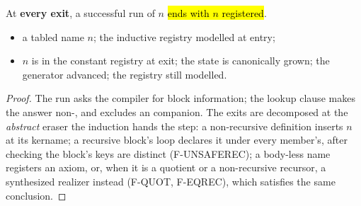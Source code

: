 \begin{lemma}
\label{lem:run_visitMutual_registers}
\leanok
{}
 At \textbf{every exit}, a successful run of  $n$ \hl{ends with $n$
registered}.
\begin{itemize}
\item {} a tabled name $n$; the inductive registry modelled at entry;
\item {} $n$ is in the constant registry at exit; the state is canonically grown; the generator
advanced; the registry still modelled.
\end{itemize}
\end{lemma}
\begin{proof}
\leanok
{}
 The run asks the compiler for block information; the lookup clause makes the answer
non-, and  excludes an  companion. The exits are
decomposed at the \emph{abstract} eraser the induction hands the step: a non-recursive definition
inserts $n$ at its kername; a recursive block's loop declares it under every member's, after checking
the block's keys are distinct (F-UNSAFEREC); a body-less name registers an axiom, or, when it is a
quotient or a non-recursive  recursor, a synthesized realizer instead (F-QUOT, F-EQREC),
which satisfies the same conclusion.
\end{proof}

